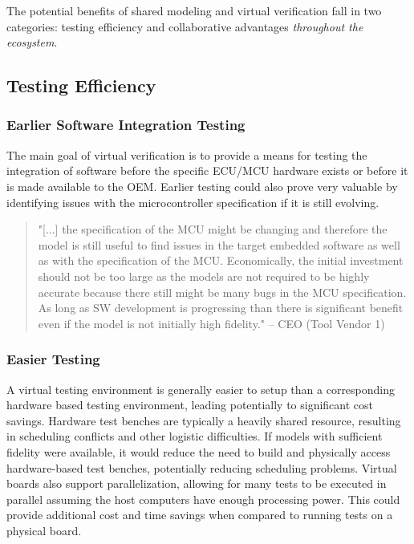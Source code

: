 The potential benefits of shared modeling and virtual verification fall in two categories:
testing efficiency and collaborative advantages \emph{throughout the ecosystem}.

\subsection{Testing Efficiency}
\subsubsection{Earlier Software Integration Testing}
The main goal of virtual verification is to provide a means for testing the integration of software before the specific ECU/MCU hardware exists or before it is made available to the OEM.
Earlier testing could also prove very valuable by identifying issues with the microcontroller specification if it is still evolving.
\begin{quote}
"[...] the specification of the MCU might be changing and therefore the model is still useful to find issues in the target embedded software as well as with the specification of the MCU. Economically, the initial investment should not be too large as the models are not required to be highly accurate because there still might be many bugs in the MCU specification. As long as SW development is progressing than there is significant benefit even if the model is not initially high fidelity."
-- CEO (Tool Vendor 1)
\end{quote}

\subsubsection{Easier Testing}
A virtual testing environment is generally easier to setup than a corresponding hardware based testing environment,
leading potentially to significant cost savings.
Hardware test benches are typically a heavily shared resource, resulting in scheduling conflicts and other logistic difficulties.
If models with sufficient fidelity were available, it would reduce the need to build and physically access hardware-based test benches, potentially reducing scheduling problems.
Virtual boards also support parallelization, allowing for many tests to be executed in parallel assuming the host computers have enough processing power.
This could provide additional cost and time savings when compared to running tests on a physical board.

